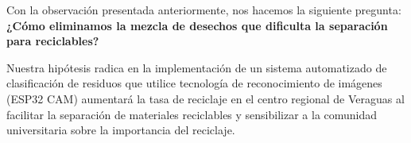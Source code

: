 Con la observación presentada anteriormente, nos hacemos la siguiente pregunta:
\textbf{¿Cómo eliminamos la mezcla de desechos que dificulta la separación para reciclables?}

Nuestra hipótesis radica en la implementación de un sistema automatizado de clasificación de residuos que utilice tecnología de reconocimiento de imágenes (ESP32 CAM) aumentará la tasa de reciclaje en el centro regional de Veraguas al facilitar la separación de materiales reciclables y sensibilizar a la comunidad universitaria sobre la importancia del reciclaje.